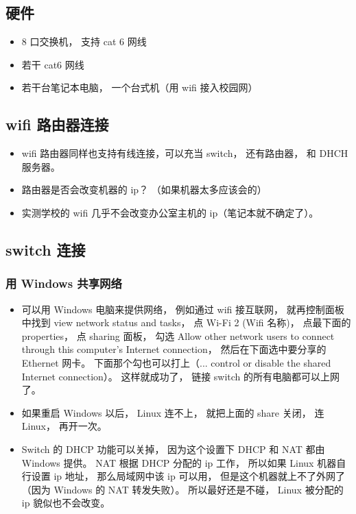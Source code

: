 
\begin{issues}
\issueDraft
\end{issues}


\subsection{硬件}
\begin{itemize}
\item 8 口交换机， 支持 cat 6 网线
\item 若干 cat6 网线
\item 若干台笔记本电脑， 一个台式机（用 wifi 接入校园网）
\end{itemize}

\subsection{wifi 路由器连接}
\begin{itemize}
\item wifi 路由器同样也支持有线连接，可以充当 switch， 还有路由器， 和 DHCH 服务器。
\item 路由器是否会改变机器的 ip？ （如果机器太多应该会的）
\item 实测学校的 wifi 几乎不会改变办公室主机的 ip（笔记本就不确定了）。
\end{itemize}

\subsection{switch 连接}
\subsubsection{用 Windows 共享网络}
\begin{itemize}
\item 可以用 Windows 电脑来提供网络， 例如通过 wifi 接互联网， 就再控制面板中找到 view network status and tasks， 点 Wi-Fi 2 (Wifi 名称)， 点最下面的 properties， 点 sharing 面板， 勾选 Allow other network users to connect through this computer's Internet connection， 然后在下面选中要分享的 Ethernet 网卡。 下面那个勾也可以打上（... control or disable the shared Internet connection）。 这样就成功了， 链接 switch 的所有电脑都可以上网了。
\item 如果重启 Windows 以后， Linux 连不上， 就把上面的 share 关闭， 连 Linux， 再开一次。
\item Switch 的 DHCP 功能可以关掉， 因为这个设置下 DHCP 和 NAT 都由 Windows 提供。 NAT 根据 DHCP 分配的 ip 工作， 所以如果 Linux 机器自行设置 ip 地址， 那么局域网中该 ip 可以用， 但是这个机器就上不了外网了（因为 Windows 的 NAT 转发失败）。 所以最好还是不碰， Linux 被分配的 ip 貌似也不会改变。
\end{itemize}

